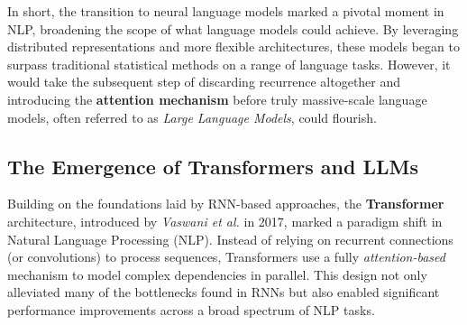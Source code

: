 \noindent
In short, the transition to neural language models marked a pivotal moment in NLP, broadening the scope of what language models could achieve. By leveraging distributed representations and more flexible architectures, these models began to surpass traditional statistical methods on a range of language tasks. However, it would take the subsequent step of discarding recurrence altogether and introducing the \textbf{attention mechanism} before truly massive-scale language models, often referred to as \textit{Large Language Models}, could flourish.

\subsection{The Emergence of Transformers and LLMs}
\label{sec:transformers_llms}

\noindent
Building on the foundations laid by RNN-based approaches, the \textbf{Transformer} architecture, introduced by \emph{Vaswani et al.} in 2017, marked a paradigm shift in Natural Language Processing (NLP). Instead of relying on recurrent connections (or convolutions) to process sequences, Transformers use a fully \emph{attention-based} mechanism to model complex dependencies in parallel. This design not only alleviated many of the bottlenecks found in RNNs but also enabled significant performance improvements across a broad spectrum of NLP tasks.

